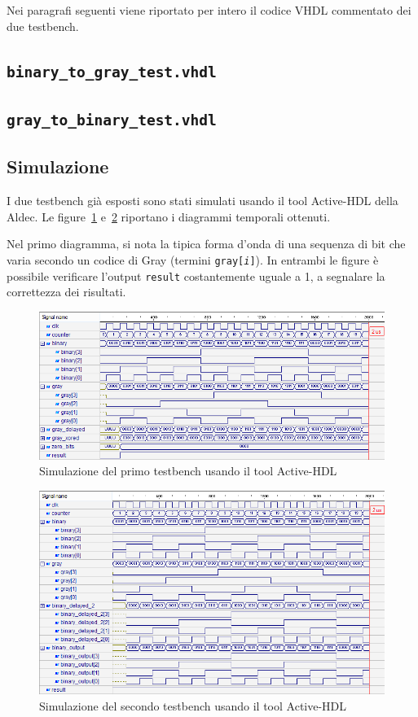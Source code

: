 \documentclass[a4paper,11pt,twoside]{article}
\begin{document}
Nei paragrafi seguenti viene riportato per intero il codice VHDL commentato dei due testbench.


\subsection{\texttt{binary\_to\_gray\_test.vhdl}}


\subsection{\texttt{gray\_to\_binary\_test.vhdl}}



\subsection{Simulazione}

I due testbench già esposti sono stati simulati usando il tool Active-HDL della Aldec. Le figure~\ref{fig:first-simulation} e~\ref{fig:second-simulation} riportano i diagrammi temporali ottenuti.

Nel primo diagramma, si nota la tipica forma d'onda di una sequenza di bit che varia secondo un codice di Gray (termini \texttt{gray[\textit{i}]}). In entrambi le figure è possibile verificare l'output \texttt{result} costantemente uguale a 1, a segnalare la correttezza dei risultati.

\begin{figure}
\centering
\includegraphics[width=\textwidth]{sim-bin2gray}
\caption{Simulazione del primo testbench usando il tool Active-HDL}
\label{fig:first-simulation}
\end{figure}

\begin{figure}
\centering
\includegraphics[width=\textwidth]{sim-gray2bin}
\caption{Simulazione del secondo testbench usando il tool Active-HDL}
\label{fig:second-simulation}
\end{figure}
\end{document}
